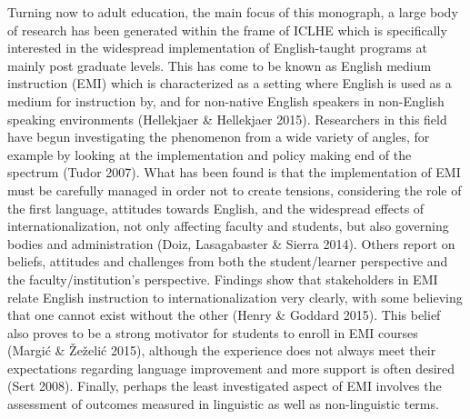 \documentclass[12pt]{article}
\newenvironment{styleStandard}{\setlength\leftskip{0cm}\setlength\rightskip{0cm plus 1fil}\setlength\parindent{0cm}\setlength\parfillskip{0pt plus 1fil}\setlength\parskip{0in plus 1pt}\writerlistparindent\writerlistleftskip\leavevmode\normalfont\normalsize\writerlistlabel\ignorespaces}{\unskip\vspace{0.111in plus 0.0111in}\par}
\newcommand\writerlistleftskip{}
\newcommand\writerlistparindent{}
\newcommand\writerlistlabel{}
\begin{document}
\begin{styleStandard}
Turning now to adult education, the main focus of this monograph, a large body of research has been generated within the frame of ICLHE which is specifically interested in the widespread implementation of English-taught programs at mainly post graduate levels. This has come to be known as English medium instruction (EMI) which is characterized as a setting where English is used as a medium for instruction by, and for non-native English speakers in non-English speaking environments (Hellekjaer \& Hellekjaer 2015). Researchers in this field have begun investigating the phenomenon from a wide variety of angles, for example by looking at the implementation and policy making end of the spectrum (Tudor 2007). What has been found is that the implementation of EMI must be carefully managed in order not to create tensions, considering the role of the first language, attitudes towards English, and the widespread effects of internationalization, not only affecting faculty and students, but also governing bodies and administration (Doiz, Lasagabaster \& Sierra 2014). Others report on beliefs, attitudes and challenges from both the student/learner perspective and the faculty/institution’s perspective. Findings show that stakeholders in EMI relate English instruction to internationalization very clearly, with some believing that one cannot exist without the other (Henry \& Goddard 2015). This belief also proves to be a strong motivator for students to enroll in EMI courses (Margić \& Žeželić 2015), although the experience does not always meet their expectations regarding language improvement and more support is often desired (Sert 2008). Finally, perhaps the least investigated aspect of EMI involves the assessment of outcomes measured in linguistic as well as non-linguistic terms. 
\end{styleStandard}
\end{document}
